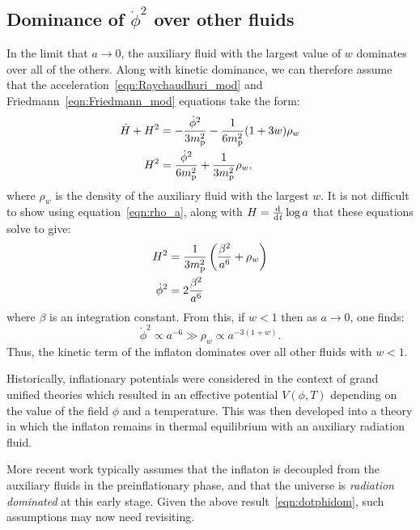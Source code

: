 \subsection{Dominance of \(\dot{\phi}^2\) over other fluids}
\label{sec:dominance_fluids}
In the limit that \(a\to 0\), the auxiliary fluid with the largest value of \(w\) dominates over all of the others. Along with kinetic dominance, we can therefore assume that the acceleration~\eqref{eqn:Raychaudhuri_mod} and Friedmann~\eqref{eqn:Friedmann_mod} equations take the form:
%
\begin{align}
  \dot{H}+H^2 
  &= 
  -\frac{\dot{\phi}^2}{3m_{\mathrm{p}}^2} - \frac{1}{6m_{\mathrm{p}}^2}(1+3w)\rho_w
  \label{eqn:Ray_KD_eq_rho}
  \\
  H^2 
  &= 
  \frac{\dot{\phi}^2}{6m_{\mathrm{p}}^2} +  \frac{1}{3m_{\mathrm{p}}^2}\rho_w,
  \label{eqn:Friedmann_KD_eq_rho}
\end{align}
where \(\rho_w\) is the density of the auxiliary fluid with the largest \(w\).  It is not difficult to show using equation~\eqref{eqn:rho_a},
along with \(H=\frac{\operatorname{d}^{}\!{}}{\operatorname{d}^{}\!{t}}\log a\) that these equations solve to give:
%
\begin{align}
  H^2 
  &= 
  \frac{1}{3m_{\mathrm{p}}^2}\left(\frac{\beta^2}{a^6} + \rho_w\right) 
  \label{eqn:H_of_a_1}
  \\
  \dot{\phi}^2 
  &= 
  2\frac{\beta^2}{a^6} 
  \label{eqn:dotphi_of_a_1}
\end{align}
%
where \(\beta\) is an integration constant. From this, if \(w<1\) then as
\(a\to 0\), one finds:
%
\begin{equation}
  \dot{\phi}^2 \propto a^{-6} 
  \gg
  \rho_w \propto a^{-3(1+w)}.
  \label{eqn:dotphidom}
\end{equation}
%
Thus, the kinetic term of the inflaton dominates over all other fluids with \(w<1\).




Historically, inflationary potentials were considered in the context of grand unified theories \citep{PhysRevLett.48.1220,linde_1982} which resulted in an effective potential \(V(\phi,T)\) depending on the value of the field \(\phi\) and a temperature.  This was then developed \citep{1995PhRvL..74.1912B,PhysRevLett.75.3218} into a theory in which the inflaton remains in thermal equilibrium with an auxiliary radiation fluid.

More recent work \citep{2007PhRvD..76f3512P} typically assumes that the inflaton is decoupled from the auxiliary fluids in the preinflationary phase, and that the universe is {\em radiation dominated\/} at this early stage. Given the above result~\eqref{eqn:dotphidom}, such assumptions may now need revisiting.



